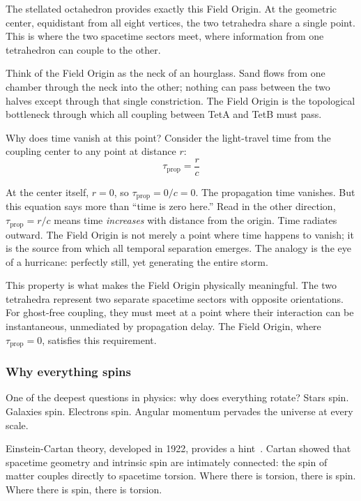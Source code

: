 \documentclass[aps,prd,preprint,superscriptaddress,showpacs,preprintnumbers,amsmath,amssymb,nofootinbib]{revtex4-2}
\begin{document}
The stellated octahedron provides exactly this Field Origin. At the geometric center, equidistant from all eight vertices, the two tetrahedra share a single point. This is where the two spacetime sectors meet, where information from one tetrahedron can couple to the other.

Think of the Field Origin as the neck of an hourglass. Sand flows from one chamber through the neck into the other; nothing can pass between the two halves except through that single constriction. The Field Origin is the topological bottleneck through which all coupling between TetA and TetB must pass.

Why does time vanish at this point? Consider the light-travel time from the coupling center to any point at distance $r$:
\begin{equation}
\tau_{\text{prop}} = \frac{r}{c}
\end{equation}

At the center itself, $r = 0$, so $\tau_{\text{prop}} = 0/c = 0$. The propagation time vanishes. But this equation says more than ``time is zero here.'' Read in the other direction, $\tau_{\text{prop}} = r/c$ means time \emph{increases} with distance from the origin. Time radiates outward. The Field Origin is not merely a point where time happens to vanish; it is the source from which all temporal separation emerges. The analogy is the eye of a hurricane: perfectly still, yet generating the entire storm.

This property is what makes the Field Origin physically meaningful. The two tetrahedra represent two separate spacetime sectors with opposite orientations. For ghost-free coupling, they must meet at a point where their interaction can be instantaneous, unmediated by propagation delay. The Field Origin, where $\tau_{\text{prop}} = 0$, satisfies this requirement.

\subsubsection*{Why everything spins}

One of the deepest questions in physics: why does everything rotate? Stars spin. Galaxies spin. Electrons spin. Angular momentum pervades the universe at every scale.

Einstein-Cartan theory, developed in 1922, provides a hint~\cite{hehl1976}. Cartan showed that spacetime geometry and intrinsic spin are intimately connected: the spin of matter couples directly to spacetime torsion. Where there is torsion, there is spin. Where there is spin, there is torsion.
\end{document}
